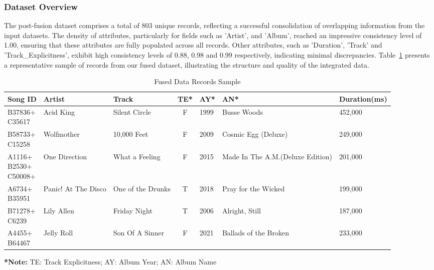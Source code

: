 \documentclass[runningheads]{llncs}
\begin{document}
\subsubsection{Dataset Overview}
The post-fusion dataset comprises a total of 803 unique records, reflecting a successful consolidation of overlapping information from the input datasets. The density of attributes, particularly for fields such as 'Artist', and 'Album', reached an impressive consistency level of 1.00, ensuring that these attributes are fully populated across all records. Other attributes, such as 'Duration', 'Track' and 'Track\_Explicitness', exhibit high consistency levels of 0.88, 0.98 and 0.99 respectively, indicating minimal discrepancies. Table~\ref{tab:fused-data-samples} presents a representative sample of records from our fused dataset, illustrating the structure and quality of the integrated data.

\begin{table}[h!]
\footnotesize  
\centering     
\renewcommand{\arraystretch}{1.3}
\caption{Fused Data Records Sample}
\label{tab:fused-data-samples}
\begin{threeparttable}
\begin{tabular}{p{1.5cm}p{1cm}p{1.5cm}cp{1cm}p{2cm}p{2cm}}
\toprule
\textbf{\centering Song ID} & \textbf{\centering Artist} & \textbf{\centering Track} & \textbf{\centering TE*} & \textbf{\centering AY*} & \textbf{\centering AN*} & \textbf{\centering Duration(ms)} \\[-0.3em]
\midrule
\parbox[t]{2cm}{B37836+\\C35617} & Acid King & Silent Circle & F & 1999 & Busse Woods & 452,000 \\
\parbox[t]{2cm}{B58733+\\C15258} & Wolf\-mother & 10,000 Feet & F & 2009 & Cosmic Egg (Deluxe) & 249,000 \\
\parbox[t]{2cm}{A1116+\\B2530+\\C50008}+ & One Direc\-tion & What a Feel\-ing & F & 2015 & Made In The A.M.\newline(Deluxe Edition) & 201,000 \\
\parbox[t]{2cm}{A6734+\\B35951} & Panic! At The Disco & One of the Drunks & T & 2018 & Pray for the Wicked & 199,000 \\
\parbox[t]{2cm}{B71278+\\C6239} & Lily Allen & Friday Night & T & 2006 & Alright, Still & 187,000 \\
\parbox[t]{2cm}{A4455+\\B64467} & Jelly Roll & Son Of A Sin\-ner & F & 2021 & Ballads of the Bro\-ken & 233,000 \\
\bottomrule
\end{tabular}
\begin{tablenotes}
\footnotesize
\item \textbf{*Note:} TE: Track Explicitness; AY: Album Year; AN: Album Name
\end{tablenotes}
\end{threeparttable}
\end{table}
\end{document}
